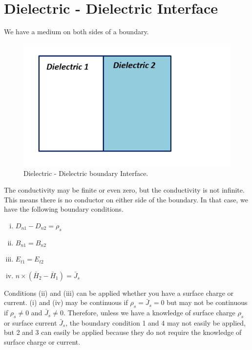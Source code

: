 \section{Dielectric - Dielectric Interface}
We have a medium on both sides of a boundary.
\begin{figure}[h]
\centering
\includegraphics[width=1\linewidth]{./graphics/dielectric_dielectric}
\caption{Dielectric - Dielectric boundary Interface.}
\end{figure}

The conductivity may be finite or even zero, but the conductivity is not infinite. This means there is no conductor on either side of the boundary. In that case, we have the following boundary conditions.
\begin{enumerate}[(i)]
\item $D_{n1} - D_{n2} = \rho_s$
\item $B_{n1} = B_{n2}$
\item $E_{t1} = E_{t2}$
\item $\hat{n} \times (\bar{H}_2 - \bar{H}_1) = \bar{J}_s$
\end{enumerate}

Conditions (ii) and (iii) can be applied whether you have a surface charge or current. (i) and (iv) may be continuous if $\rho_s = \bar{J}_s = 0$ but may not be continuous if $\rho_s\neq 0$ and $\bar{J}_s\neq 0$.
Therefore, unless we have a knowledge of surface charge $\rho_s$ or surface current $\bar{J}_s$, the boundary condition 1 and 4 may not easily be applied, but 2 and 3 can easily be applied because they do not require the knowledge of surface charge or current.

